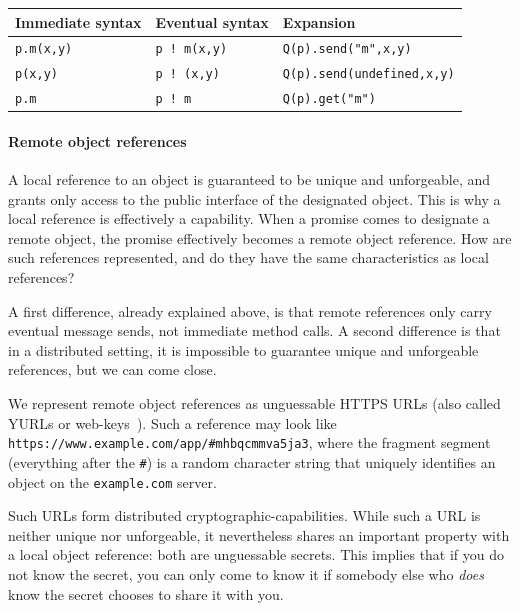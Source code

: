 \documentclass{llncs}
\begin{document}

\begin{center}
  \begin{tabular}{|l|l|l|}
  \hline
  Immediate syntax & Eventual syntax & Expansion \\
  \hline
  \texttt{p.m(x,y)} & \texttt{p ! m(x,y)} & \texttt{Q(p).send("m",x,y)} \\
  \texttt{p(x,y)} & \texttt{p ! (x,y)} & \texttt{Q(p).send(undefined,x,y)}\\
  \texttt{p.m} & \texttt{p ! m} & \texttt{Q(p).get("m")}\\
  \hline
  \end{tabular} 
\end{center}

\paragraph{Remote object references}

A local reference to an object is guaranteed to be unique and unforgeable, and grants only access to the public interface of the designated object. This is why a local reference is effectively a capability. When a promise comes to designate a remote object, the promise effectively becomes a remote object reference. How are such references represented, and do they have the same characteristics as local references?

A first difference, already explained above, is that remote references only carry eventual message sends, not immediate method calls. A second difference is that in a distributed setting, it is impossible to guarantee unique and unforgeable references, but we can come close.

We represent remote object references as unguessable HTTPS URLs (also called YURLs or web-keys~\cite{mashing_with_permission}). Such a reference may look like \texttt{https://www.example.com/app/\#mhbqcmmva5ja3}, where the fragment segment (everything after the \texttt{\#}) is a random character string that uniquely identifies an object on the \texttt{example.com} server.

Such URLs form distributed cryptographic-capabilities. While such a URL is neither unique nor unforgeable, it nevertheless shares an important property with a local object reference: both are unguessable secrets. This implies that if you do not know the secret, you can only come to know it if somebody else who \emph{does} know the secret chooses to share it with you.
\end{document}
